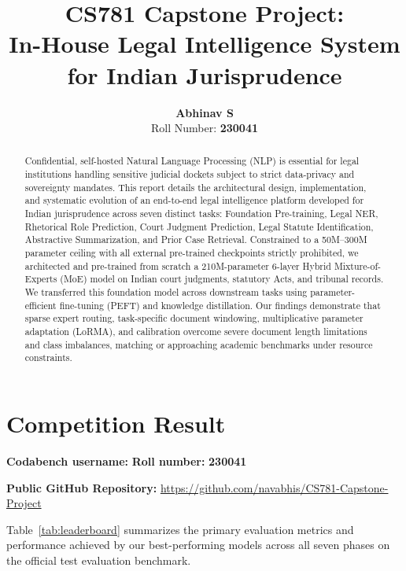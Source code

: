 \documentclass[11pt, oneside]{article}
\title{\textbf{CS781 Capstone Project:\\In-House Legal Intelligence System for Indian Jurisprudence}}
\author{
    \textbf{Abhinav S} \\
    Roll Number: \textbf{230041}
}
\date{}
\begin{document}
\maketitle

\begin{abstract}
Confidential, self-hosted Natural Language Processing (NLP) is essential for legal institutions handling sensitive judicial dockets subject to strict data-privacy and sovereignty mandates. This report details the architectural design, implementation, and systematic evolution of an end-to-end legal intelligence platform developed for Indian jurisprudence across seven distinct tasks: Foundation Pre-training, Legal NER, Rhetorical Role Prediction, Court Judgment Prediction, Legal Statute Identification, Abstractive Summarization, and Prior Case Retrieval. Constrained to a 50M--300M parameter ceiling with all external pre-trained checkpoints strictly prohibited, we architected and pre-trained from scratch a 210M-parameter 6-layer Hybrid Mixture-of-Experts (MoE) model on Indian court judgments, statutory Acts, and tribunal records. We transferred this foundation model across downstream tasks using parameter-efficient fine-tuning (PEFT) and knowledge distillation. Our findings demonstrate that sparse expert routing, task-specific document windowing, multiplicative parameter adaptation (LoRMA), and calibration overcome severe document length limitations and class imbalances, matching or approaching academic benchmarks under resource constraints.
\end{abstract}

\section{Competition Result}
\noindent
\textbf{Codabench username:} \underline{\hspace{3.5cm}}
\hfill
\textbf{Roll number:} \textbf{230041}
\medskip

\noindent
\textbf{Public GitHub Repository:} \url{https://github.com/navabhis/CS781-Capstone-Project}
\medskip

\noindent
Table~\ref{tab:leaderboard} summarizes the primary evaluation metrics and performance achieved by our best-performing models across all seven phases on the official test evaluation benchmark.
\end{document}
